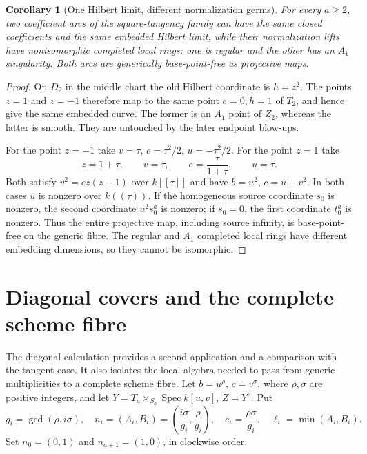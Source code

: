 \documentclass[11pt,reqno]{amsart}
\numberwithin{equation}{section}
\newtheorem{corollary}[theorem]{Corollary}
\theoremstyle{definition}\newtheorem{definition}[theorem]{Definition}
\theoremstyle{remark}\newtheorem{remark}[theorem]{Remark}
\DeclareMathOperator{\Spec}{Spec}\DeclareMathOperator{\PGL}{PGL}
\begin{document}
\begin{corollary}[One Hilbert limit, different normalization germs]
\label{cor:tangent-lost-labels-v171}
For every $a\geq2$, two coefficient arcs of the square-tangency family
can have the same closed coefficients and the same embedded Hilbert
limit, while their normalization lifts have nonisomorphic completed
local rings: one is regular and the other has an $A_1$ singularity.
Both arcs are generically base-point-free as projective maps.
\end{corollary}
\begin{proof}
On $D_2$ in the middle chart the old Hilbert coordinate is $h=z^2$.
The points $z=1$ and $z=-1$ therefore map to the same point $e=0,h=1$
of $T_2$, and hence give the same embedded curve. The former is an
$A_1$ point of $Z_2$, whereas the latter is smooth. They are untouched
by the later endpoint blow-ups.

For the point $z=-1$ take $v=\tau$, $e=\tau^2/2$, $u=-\tau^2/2$.
For the point $z=1$ take
\[
 z=1+\tau,\qquad v=\tau,\qquad
 e=\frac{\tau}{1+\tau},\qquad u=\tau.
\]
Both satisfy $v^2=ez(z-1)$ over $k[[\tau]]$ and have
$b=u^2$, $c=u+v^2$. In both cases $u$ is nonzero over $k((\tau))$.
If the homogeneous source coordinate $s_0$ is nonzero, the second
coordinate $u^2s_0^a$ is nonzero; if $s_0=0$, the first coordinate
$t_0^a$ is nonzero. Thus the entire projective map, including source
infinity, is base-point-free on the generic fibre. The regular and
$A_1$ completed local rings have different embedding dimensions, so
they cannot be isomorphic.
\end{proof}


\section{Diagonal covers and the complete scheme fibre}
\label{sec:diagonal-v171}
The diagonal calculation provides a second application and a comparison
with the tangent case. It also isolates the local algebra needed to
pass from generic multiplicities to a complete scheme fibre. Let
$b=u^\rho$, $c=v^\sigma$, where $\rho,\sigma$ are positive integers,
and let $Y=T_a\times_{S_a}\Spec k[u,v]$, $Z=Y^\nu$. Put
\begin{equation}\label{eq:diagonal-data-v171}
 g_i=\gcd(\rho,i\sigma),\quad
 n_i=(A_i,B_i)=\left(\frac{i\sigma}{g_i},\frac{\rho}{g_i}\right),
 \quad e_i=\frac{\rho\sigma}{g_i},\quad \ell_i=\min(A_i,B_i).
\end{equation}
Set $n_0=(0,1)$ and $n_{a+1}=(1,0)$, in clockwise order.
\end{document}
